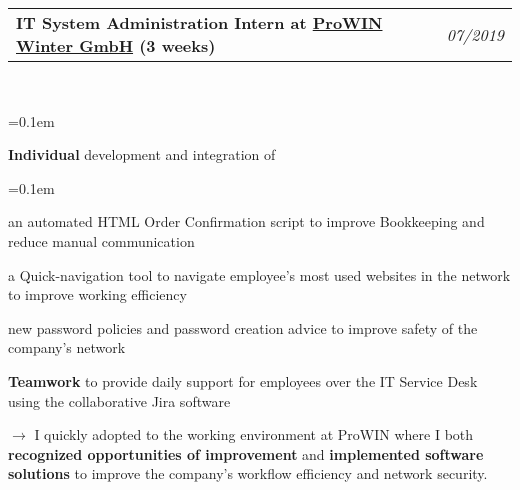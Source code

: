 \documentclass[10pt,letterpaper]{article}
\makeatletter
\newcommand{\headerrow}[2]
{\begin{tabular*}{\linewidth}{l@{\extracolsep{\fill}}r}
	#1 &
	#2 \\
\end{tabular*}}
\makeatother
\begin{document}
\noindent
\headerrow{\textbf{IT System Administration Intern at \href{https://www.prowin.net/}{ProWIN Winter GmbH} (3 weeks)}}{\emph{07/2019}}
\\
\vspace{-1.6em}
\begin{itemize*}
	\parskip=0.1em
	\item \textbf{Individual} development and integration of 
	\begin{enumerate*}
		\parskip=0.1em
		\item an automated HTML Order Confirmation script to improve Bookkeeping and reduce manual communication
		\item a Quick-navigation tool to navigate employee's most used websites in the network to improve working efficiency
		\item new password policies and password creation advice to improve safety of the company's network
	\end{enumerate*}
	\item \textbf{Teamwork} to provide daily support for employees over the IT Service Desk using the collaborative Jira software
	\vspace{2mm}
	\item [$\rightarrow$] I quickly adopted to the working environment at ProWIN where I both \textbf{recognized opportunities of improvement} 
	and \textbf{implemented software solutions} to improve the company's workflow efficiency and network security.
\end{itemize*}


\end{document}
